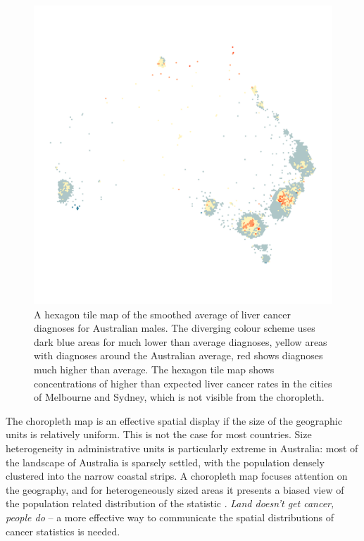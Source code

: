 \documentclass{monashthesis}
\begin{document}
\begin{figure}[H]
\centering
\includegraphics[width=16cm]{figures/04-experiment/aus_liver_m_hex.png}
\caption{\label{fig:liver-hex}A hexagon tile map of the smoothed average of liver cancer diagnoses for Australian males. The diverging colour scheme uses dark blue areas for much lower than average diagnoses, yellow areas with diagnoses around the Australian average, red shows diagnoses much higher than average. The hexagon tile map shows concentrations of higher than expected liver cancer rates in the cities of Melbourne and Sydney, which is not visible from the choropleth.}
\end{figure}

The choropleth map is an effective spatial display if the size of the geographic units is relatively uniform. This is not the case for most countries. Size heterogeneity in administrative units is particularly extreme in Australia: most of the landscape of Australia is sparsely settled, with the population densely clustered into the narrow coastal strips. A choropleth map focuses attention on the geography, and for heterogeneously sized areas it presents a biased view of the population related distribution of the statistic \autocite{CBATCC}. \emph{Land doesn't get cancer, people do} -- a more effective way to communicate the spatial distributions of cancer statistics is needed.
\end{document}
